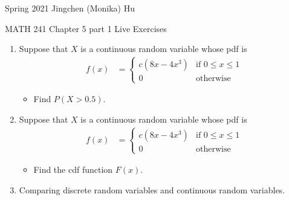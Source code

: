 \documentclass[11pt]{article}
\begin{document}
\enlargethispage{\baselineskip}

Spring 2021 \hfill Jingchen (Monika) Hu\\

\begin{center}
{\huge MATH 241 Chapter 5 part 1 Live Exercises}	\\
\end{center}
\vspace{0.5cm}

\begin{enumerate}


\item Suppose that $X$ is a continuous random variable whose pdf is
\begin{align*}
f(x) &= \begin{cases}
c (8x - 4 x^3)& \text{if $0 \leq x \leq 1$} \\
0 & \text{otherwise}
\end{cases}
\end{align*}
\vspace{-0.5cm}
\begin{itemize}
\item Find $P(X > 0.5)$.
\end{itemize}


\item Suppose that $X$ is a continuous random variable whose pdf is
\begin{align*}
f(x) &= \begin{cases}
c (8x - 4 x^3)& \text{if $0 \leq x \leq 1$} \\
0 & \text{otherwise}
\end{cases}
\end{align*}
\vspace{-0.5cm}
\begin{itemize}
\item Find the cdf function $F(x)$.
\end{itemize}

\item Comparing discrete random variables and continuous random variables.


\end{enumerate}
\end{document}

